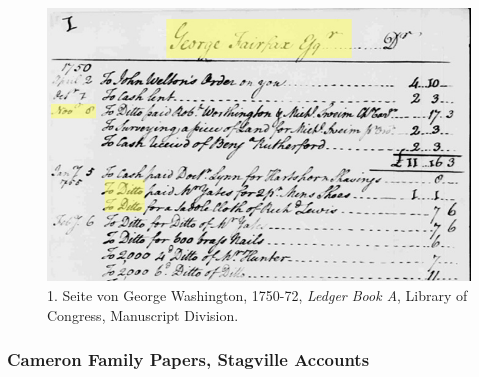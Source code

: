 \documentclass[12pt,a4paper]{article}
\begin{document}
\begin{figure}[H]
\centering
	\includegraphics[width=1\textwidth]{img/washington.png}  
    \caption[1. Seite von George Washington, 1750-72, \textit{Ledger Book A}, Library of Congress, Manuscript Division, STERTZER Jennifer: \protect\url{doi.org/10.16995/dscn.57}]{1. Seite von George Washington, 1750-72, \textit{Ledger Book A}, Library of Congress, Manuscript Division.} \label{fig:washington}
\end{figure}


\subsubsection{Cameron Family Papers, Stagville Accounts}
\end{document}
